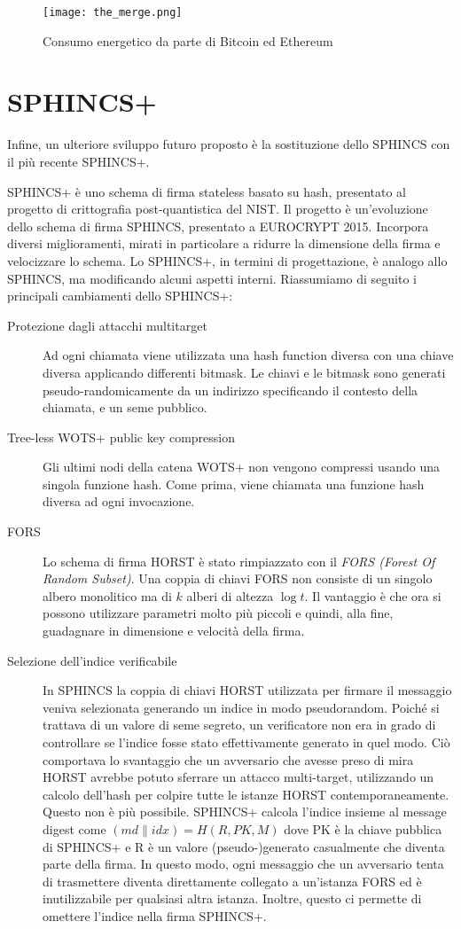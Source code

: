 \begin{figure}[h]
  \centering
  \texttt{[image: the\_merge.png]}
  \caption{Consumo energetico da parte di Bitcoin ed Ethereum}
  \label{fig:the_merge}
\end{figure}

\section{SPHINCS+}
Infine, un ulteriore sviluppo futuro proposto è la sostituzione dello SPHINCS con il più recente SPHINCS+.

SPHINCS+ è uno schema di firma stateless basato su hash, presentato al progetto di crittografia post-quantistica del NIST. Il progetto è un'evoluzione dello schema di firma SPHINCS, presentato a EUROCRYPT 2015. Incorpora diversi miglioramenti, mirati in particolare a ridurre la dimensione della firma e velocizzare lo schema. Lo SPHINCS+, in termini di progettazione, è analogo allo SPHINCS, ma modificando alcuni aspetti interni. Riassumiamo di seguito i principali cambiamenti dello SPHINCS+:
\begin{description}
  \item[Protezione dagli attacchi multitarget] Ad ogni chiamata viene utilizzata una hash function diversa con una chiave diversa applicando differenti bitmask. Le chiavi e le bitmask sono generati pseudo-randomicamente da un indirizzo specificando il contesto della chiamata, e un seme pubblico.
  \item[Tree-less WOTS+ public key compression] Gli ultimi nodi della catena WOTS+ non vengono compressi usando una singola funzione hash. Come prima, viene chiamata una funzione hash diversa ad ogni invocazione.
  \item[FORS] Lo schema di firma HORST è stato rimpiazzato con il \textit{FORS (Forest Of Random Subset)}. Una coppia di chiavi FORS non consiste di un singolo albero monolitico ma di \(k\) alberi di altezza \(\log t\). Il vantaggio è che ora si possono utilizzare parametri molto più piccoli e quindi, alla fine, guadagnare in dimensione e velocità della firma.
  \item[Selezione dell'indice verificabile] In SPHINCS la coppia di chiavi HORST utilizzata per firmare il messaggio veniva selezionata generando un indice in modo pseudorandom. Poiché si trattava di un valore di seme segreto, un verificatore non era in grado di controllare se l'indice fosse stato effettivamente generato in quel modo.  Ciò comportava lo svantaggio che un avversario che avesse preso di mira HORST avrebbe potuto sferrare un attacco multi-target, utilizzando un calcolo dell'hash per colpire tutte le istanze HORST contemporaneamente. Questo non è più possibile. SPHINCS+ calcola l'indice insieme al message digest come \(( md \| idx ) = H ( R, PK, M )\) dove PK è la chiave pubblica di SPHINCS+ e R è un valore (pseudo-)generato casualmente che diventa parte della firma. In questo modo, ogni messaggio che un avversario tenta di trasmettere diventa direttamente collegato a un'istanza FORS ed è inutilizzabile per qualsiasi altra istanza. Inoltre, questo ci permette di omettere l'indice nella firma SPHINCS+.
\end{description}